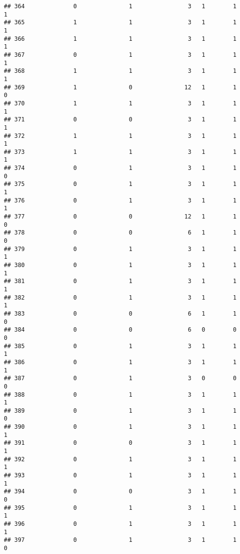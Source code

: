 \documentclass[]{article}
\begin{document}
\begin{verbatim}
## 364              0               1                3   1        1        1
## 365              1               1                3   1        1        1
## 366              1               1                3   1        1        1
## 367              0               1                3   1        1        1
## 368              1               1                3   1        1        1
## 369              1               0               12   1        1        0
## 370              1               1                3   1        1        1
## 371              0               0                3   1        1        1
## 372              1               1                3   1        1        1
## 373              1               1                3   1        1        1
## 374              0               1                3   1        1        0
## 375              0               1                3   1        1        1
## 376              0               1                3   1        1        1
## 377              0               0               12   1        1        0
## 378              0               0                6   1        1        0
## 379              0               1                3   1        1        1
## 380              0               1                3   1        1        1
## 381              0               1                3   1        1        1
## 382              0               1                3   1        1        1
## 383              0               0                6   1        1        0
## 384              0               0                6   0        0        0
## 385              0               1                3   1        1        1
## 386              0               1                3   1        1        1
## 387              0               1                3   0        0        0
## 388              0               1                3   1        1        1
## 389              0               1                3   1        1        0
## 390              0               1                3   1        1        1
## 391              0               0                3   1        1        1
## 392              0               1                3   1        1        1
## 393              0               1                3   1        1        1
## 394              0               0                3   1        1        0
## 395              0               1                3   1        1        1
## 396              0               1                3   1        1        1
## 397              0               1                3   1        1        0

\end{verbatim}
\end{document}
